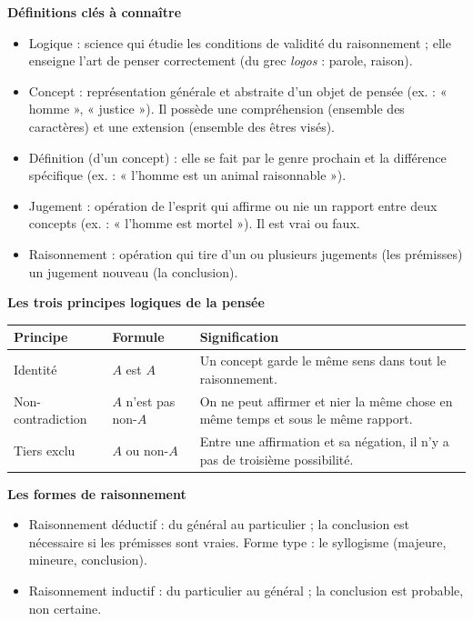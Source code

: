 \documentclass[11pt]{article}
\newcommand{\cle}[1]{{\popxbold\color{popdark}#1}}
\begin{document}
\begin{bilan}
\textbf{Définitions clés à connaître}
\begin{itemize}
  \item \cle{Logique} : science qui étudie les conditions de validité du raisonnement ; elle enseigne l'art de penser correctement (du grec \emph{logos} : parole, raison).
  \item \cle{Concept} : représentation générale et abstraite d'un objet de pensée (ex. : « homme », « justice »). Il possède une \cle{compréhension} (ensemble des caractères) et une \cle{extension} (ensemble des êtres visés).
  \item \cle{Définition} (d'un concept) : elle se fait par le \cle{genre prochain} et la \cle{différence spécifique} (ex. : « l'homme est un animal raisonnable »).
  \item \cle{Jugement} : opération de l'esprit qui affirme ou nie un rapport entre deux concepts (ex. : « l'homme est mortel »). Il est vrai ou faux.
  \item \cle{Raisonnement} : opération qui tire d'un ou plusieurs jugements (les prémisses) un jugement nouveau (la conclusion).
\end{itemize}

\textbf{Les trois principes logiques de la pensée}
\begin{center}
\begin{tabularx}{\linewidth}{|l|X|X|}
\hline
\rowcolor{popblueL} \textbf{Principe} & \textbf{Formule} & \textbf{Signification} \\
\hline
Identité & $A$ est $A$ & Un concept garde le même sens dans tout le raisonnement. \\
\hline
Non-contradiction & $A$ n'est pas non-$A$ & On ne peut affirmer et nier la même chose en même temps et sous le même rapport. \\
\hline
Tiers exclu & $A$ ou non-$A$ & Entre une affirmation et sa négation, il n'y a pas de troisième possibilité. \\
\hline
\end{tabularx}
\end{center}

\textbf{Les formes de raisonnement}
\begin{itemize}
  \item \cle{Raisonnement déductif} : du général au particulier ; la conclusion est nécessaire si les prémisses sont vraies. Forme type : le \cle{syllogisme} (majeure, mineure, conclusion).
  \item \cle{Raisonnement inductif} : du particulier au général ; la conclusion est probable, non certaine.
\end{itemize}


\end{bilan}
\end{document}
